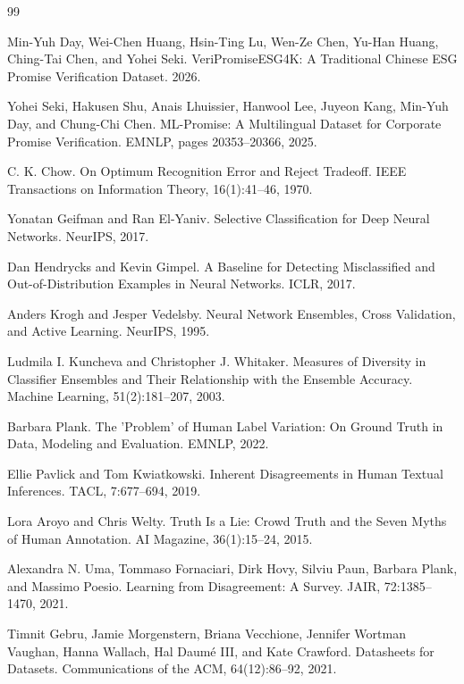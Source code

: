 \documentclass[11pt,a4paper]{ctexart}
\begin{document}
\begin{thebibliography}{99}
\small

 Min-Yuh Day, Wei-Chen Huang, Hsin-Ting Lu, Wen-Ze Chen,
Yu-Han Huang, Ching-Tai Chen, and Yohei Seki. VeriPromiseESG4K: A Traditional
Chinese ESG Promise Verification Dataset. 2026.

 Yohei Seki, Hakusen Shu, Anais Lhuissier, Hanwool Lee,
Juyeon Kang, Min-Yuh Day, and Chung-Chi Chen. ML-Promise: A Multilingual Dataset
for Corporate Promise Verification. EMNLP, pages 20353--20366, 2025.

 C. K. Chow. On Optimum Recognition Error and Reject Tradeoff.
IEEE Transactions on Information Theory, 16(1):41--46, 1970.

 Yonatan Geifman and Ran El-Yaniv. Selective
Classification for Deep Neural Networks. NeurIPS, 2017.

 Dan Hendrycks and Kevin Gimpel. A Baseline for
Detecting Misclassified and Out-of-Distribution Examples in Neural Networks.
ICLR, 2017.

 Anders Krogh and Jesper Vedelsby. Neural Network Ensembles,
Cross Validation, and Active Learning. NeurIPS, 1995.

 Ludmila I. Kuncheva and Christopher J. Whitaker. Measures
of Diversity in Classifier Ensembles and Their Relationship with the Ensemble
Accuracy. Machine Learning, 51(2):181--207, 2003.

 Barbara Plank. The 'Problem' of Human Label Variation: On
Ground Truth in Data, Modeling and Evaluation. EMNLP, 2022.

 Ellie Pavlick and Tom Kwiatkowski. Inherent Disagreements
in Human Textual Inferences. TACL, 7:677--694, 2019.

 Lora Aroyo and Chris Welty. Truth Is a Lie: Crowd Truth and
the Seven Myths of Human Annotation. AI Magazine, 36(1):15--24, 2015.

 Alexandra N. Uma, Tommaso Fornaciari, Dirk Hovy, Silviu
Paun, Barbara Plank, and Massimo Poesio. Learning from Disagreement: A Survey.
JAIR, 72:1385--1470, 2021.

 Timnit Gebru, Jamie Morgenstern, Briana Vecchione,
Jennifer Wortman Vaughan, Hanna Wallach, Hal Daumé III, and Kate Crawford.
Datasheets for Datasets. Communications of the ACM, 64(12):86--92, 2021.


\end{thebibliography}
\end{document}
